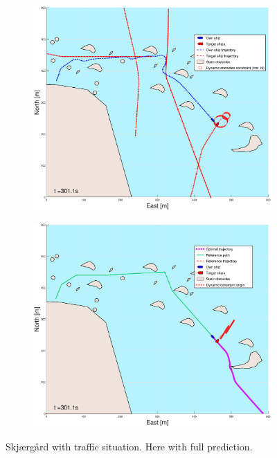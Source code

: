 \begin{figure}[ht]
\begin{subfigure}[b]{0.499\textwidth}
    \end{subfigure}
    \hfill
    \\
    \begin{subfigure}[b]{0.49\textwidth}
        \centering
        \includegraphics[width=\textwidth]{Images/Figures/skjergard_m_trafikk_NEW/_Simple_0fig1_time=301}
    \end{subfigure}
    \hfill
    \begin{subfigure}[b]{0.499\textwidth}
        \centering
        \includegraphics[width=\textwidth]{Images/Figures/skjergard_m_trafikk_NEW/_Simple_0fig999_time=301}
    \end{subfigure}
    \hfill
    \caption{Skjærgård with traffic situation. Here with full prediction.}
\end{figure}

